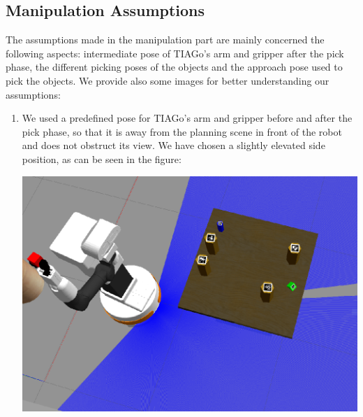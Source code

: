 \subsection{Manipulation Assumptions}
The assumptions made in the manipulation part are mainly concerned the following aspects: intermediate pose of TIAGo's arm and gripper after the pick phase, the different picking poses of the objects and the approach pose used to pick the objects. We provide also some images for better understanding our assumptions:
\begin{enumerate}
    \item We used a predefined pose for TIAGo's arm and gripper before and after the pick phase, so that it is away from the planning scene in front of the robot  and does not obstruct its view. We have chosen a slightly elevated side position, as can be seen in the figure:
    \begin{center}
    \includegraphics[scale = 0.3]{images/manipulations/afterPick.png}    
    \end{center}    
    

\end{enumerate}
